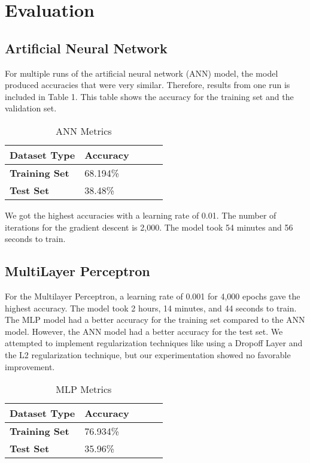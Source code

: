 \section{Evaluation}
\label{sec:evaluation}

\subsection{Artificial Neural Network}
\label{sec:evaluation:Artificial Neural Network}
 For multiple runs of the artificial neural network (ANN) model, the model produced accuracies that were very similar. Therefore, results from one run is included in Table 1. This table shows the accuracy for the training set and the validation set.
 
 \begin{table}[ht] 
    \centering
    \begin{tabular}{|l|l|l|l|l|}
        \hline
        \textbf{Dataset Type} & \textbf{Accuracy}\\
        \hline
        \textbf{Training Set} & 68.194\%\\
        \textbf{Test Set} & 38.48\%\\
        \hline
    \end{tabular}
    \caption{ANN Metrics}
    \label{tab:Table1}
\end{table}

\noindent We got the highest accuracies with a learning rate of 0.01. The number of iterations for the gradient descent is 2,000. The model took 54 minutes and 56 seconds to train.

\subsection{MultiLayer Perceptron}
\label{sec:evaluation:MultiLayer Perceptron}
For the Multilayer Perceptron, a learning rate of 0.001 for 4,000 epochs gave the highest accuracy. The model took 2 hours, 14 minutes, and 44 seconds to train. The MLP model had a better accuracy for the training set compared to the ANN model. However, the ANN model had a better accuracy for the test set. We attempted to implement regularization techniques like using a Dropoff Layer and the L2 regularization technique, but our experimentation showed no favorable improvement.

\begin{table}[ht] 
    \centering
    \begin{tabular}{|l|l|l|l|l|}
        \hline
        \textbf{Dataset Type} & \textbf{Accuracy}\\
        \hline
        \textbf{Training Set} & 76.934\%\\
        \textbf{Test Set} & 35.96\%\\
        \hline
    \end{tabular}
    \caption{MLP Metrics}
    \label{tab:Table3}
\end{table}

